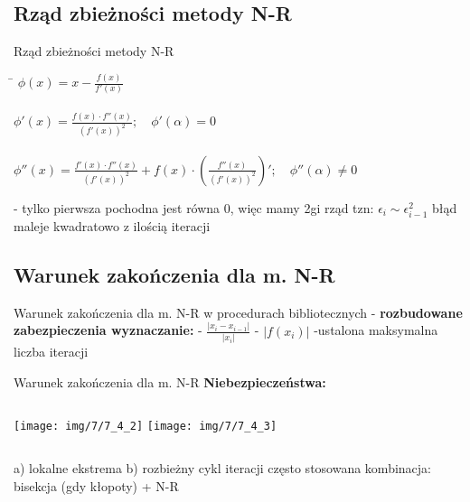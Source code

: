 \subsection{Rząd zbieżności metody N-R}
\begin{frame}{Rząd zbieżności metody N-R}
	\begin{tabbing}
		\qquad\qquad \= $\phi(x) = x - \frac{f(x)}{f'(x)}$\\\\
		\> $\phi'(x) = \frac{f(x) \cdot f''(x)}{(f'(x))^{2}}; \quad \phi'(\alpha) = 0$\\\\
		\> $\phi''(x) = \frac{f'(x) \cdot f''(x)}{(f'(x))^{2}}+f(x) \cdot(\frac{f''(x)}{(f'(x))^{2}})' ; \quad \phi''(\alpha) \neq 0$ \quad \\
	\end{tabbing}
	- tylko pierwsza pochodna jest równa 0, więc mamy 2gi rząd tzn: $\epsilon_{i} \sim \epsilon_{i-1}^{2}$ błąd maleje kwadratowo z ilością iteracji
\end{frame}
\subsection{Warunek zakończenia dla m. N-R}
\begin{frame}{Warunek zakończenia dla m. N-R}
	w procedurach bibliotecznych - \textbf{rozbudowane zabezpieczenia wyznaczanie:}\linebreak\linebreak
	- $\frac{\lvert x_{i} - x_{i-1} \rvert}{\lvert x_{i} \rvert}$\linebreak\linebreak
	- $\lvert f(x_{i}) \rvert$\linebreak\linebreak
	-ustalona maksymalna liczba iteracji
\end{frame}
\begin{frame}{Warunek zakończenia dla m. N-R}
	\textbf{Niebezpieczeństwa:}\linebreak
	\begin{columns}
		\centering   \texttt{[image: img/7/7\_4\_2]}
		\texttt{[image: img/7/7\_4\_3]}
	\end{columns}
	a) lokalne ekstrema\linebreak
	b) rozbieżny cykl iteracji %
	\linebreak często stosowana kombinacja: bisekcja (gdy kłopoty) + N-R
\end{frame}